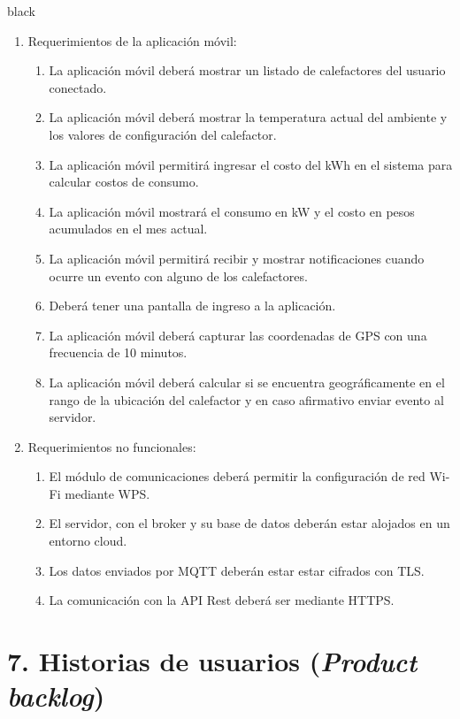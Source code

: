 \documentclass[
11pt, %
codirector, %
]{charter}
\begin{document}
\begin{consigna}{black}
\begin{enumerate}
	\item Requerimientos de la aplicación móvil:
		\begin{enumerate}
			\item La aplicación móvil deberá mostrar un listado de calefactores del usuario conectado.
			\item La aplicación móvil deberá mostrar la temperatura actual del ambiente y los valores de configuración del calefactor.
			\item La aplicación móvil permitirá ingresar el costo del kWh en el sistema para calcular costos de consumo.
			\item La aplicación móvil mostrará el consumo en kW
			 y el costo en pesos acumulados en el mes actual.
			\item La aplicación móvil permitirá recibir y mostrar notificaciones cuando ocurre un evento con alguno de los calefactores.
			\item Deberá tener una pantalla de ingreso a la aplicación.
			\item La aplicación móvil deberá capturar las coordenadas de GPS con una frecuencia de 10 minutos.
			\item La aplicación móvil deberá calcular si se encuentra geográficamente en el rango de la ubicación del calefactor y en caso afirmativo enviar evento al servidor.
			
		\end{enumerate}
	\item Requerimientos no funcionales:
		\begin{enumerate}
			\item El módulo de comunicaciones deberá permitir la configuración de red Wi-Fi mediante WPS.
			\item El servidor, con el broker y su base de datos deberán estar alojados en un entorno cloud.
			\item Los datos enviados por MQTT deberán estar estar cifrados con TLS.
			\item La comunicación con la API Rest deberá ser mediante HTTPS.
		
			
		\end{enumerate}
	
\end{enumerate}



\end{consigna}
\pagebreak
\section{7. Historias de usuarios (\textit{Product backlog})}
\label{sec:backlog}
\end{document}
